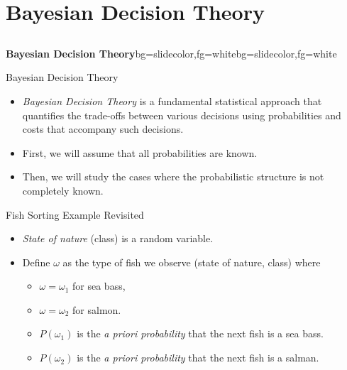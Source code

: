 \section{Bayesian Decision Theory}
\subsection{}
\begin{frame}{}
\begin{variableblock}{\centering \Large \textbf{\vspace{4pt}\newline Bayesian Decision Theory\vspace{4pt}}}{bg=slidecolor,fg=white}{bg=slidecolor,fg=white}
\end{variableblock}
\end{frame}

\begin{frame}{Bayesian Decision Theory}
\begin{itemize}
\setlength{\itemsep}{8pt}
\item \textit{\color{mycolor1}Bayesian Decision Theory} is a fundamental statistical
approach that quantifies the trade-offs between various
decisions using probabilities and costs that accompany
such decisions.\nocite{duda2012pattern}
\item First, we will assume that all probabilities are known.
\item Then, we will study the cases where the probabilistic
structure is not completely known.
\end{itemize}
\end{frame}

\begin{frame}{Fish Sorting Example Revisited}
\begin{itemize}
\item \textit{\color{mycolor1}State of nature} (class) is a random variable.
\item Define $\omega$ as the type of fish we observe (state of nature, class) where
\begin{itemize}
\item $\omega=\omega_1$ for sea bass,
\item $\omega=\omega_2$ for salmon.
\item $P(\omega_1)$ is the \textit{\color{mycolor1}a priori probability} that the next fish is a sea bass.
\item $P(\omega_2)$ is the \textit{a priori probability} that the next fish is a salman.
\end{itemize}
\end{itemize}
\end{frame}

